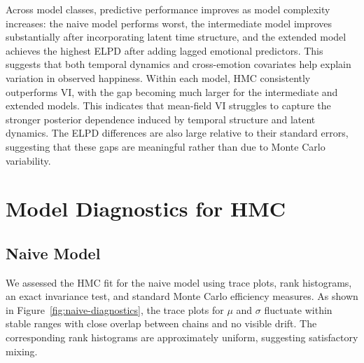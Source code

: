 \documentclass[12pt,letterpaper,fleqn]{article}
\begin{document}

Across model classes, predictive performance improves as model complexity increases: the naive model performs worst, the intermediate model improves substantially after incorporating latent time structure, and the extended model achieves the highest ELPD after adding lagged emotional predictors. This suggests that both temporal dynamics and cross-emotion covariates help explain variation in observed happiness. Within each model, HMC consistently outperforms VI, with the gap becoming much larger for the intermediate and extended models. This indicates that mean-field VI struggles to capture the stronger posterior dependence induced by temporal structure and latent dynamics. The ELPD differences are also large relative to their standard errors, suggesting that these gaps are meaningful rather than due to Monte Carlo variability.


\section{Model Diagnostics for HMC}

\subsection{Naive Model}

We assessed the HMC fit for the naive model using trace plots, rank histograms, an exact invariance test, and standard Monte Carlo efficiency measures. As shown in Figure~\ref{fig:naive-diagnostics}, the trace plots for $\mu$ and $\sigma$ fluctuate within stable ranges with close overlap between chains and no visible drift. The corresponding rank histograms are approximately uniform, suggesting satisfactory mixing.
\end{document}
